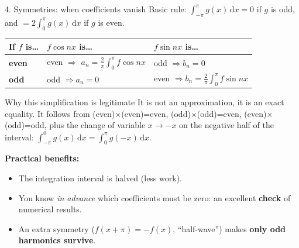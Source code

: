 \documentclass[aspectratio=169,10pt]{beamer}
\newcommand{\dd}{\,\mathrm{d}}
\begin{document}
\begin{frame}{4. Symmetries: when coefficients vanish}
  \small
  Basic rule: $\displaystyle\int_{-\pi}^{\pi}g(x)\dd x=0$ if $g$ is odd, and $=2\int_0^{\pi}g(x)\dd x$ if $g$ is even.
  \begin{center}
  \begin{tabular}{@{}lll@{}}
    \toprule
    If $f$ is\ldots & $f\cos nx$ is\ldots & $f\sin nx$ is\ldots\\
    \midrule
    \textbf{even} & even $\Rightarrow$ $a_n=\frac2\pi\!\int_0^\pi f\cos nx$ & odd $\Rightarrow b_n=0$\\
    \textbf{odd}  & odd $\Rightarrow a_n=0$ & even $\Rightarrow b_n=\frac2\pi\!\int_0^\pi f\sin nx$\\
    \bottomrule
  \end{tabular}
  \end{center}
  \begin{keybox}{Why this simplification is legitimate}
    It is not an approximation, it is an exact equality. It follows from (even)$\times$(even)=even, (odd)$\times$(odd)=even, (even)$\times$(odd)=odd, plus the change of variable $x\to-x$ on the negative half of the interval: $\int_{-\pi}^{0}g(x)\dd x=\int_{0}^{\pi}g(-x)\dd x$.
  \end{keybox}
  \textbf{Practical benefits:}
  \begin{itemize}
    \item The integration interval is halved (less work).
    \item You know \emph{in advance} which coefficients must be zero: an excellent \textbf{check} of numerical results.
    \item An extra symmetry ($f(x+\pi)=-f(x)$, ``half-wave'') makes \textbf{only odd harmonics survive}.
  \end{itemize}
\end{frame}
\end{document}
